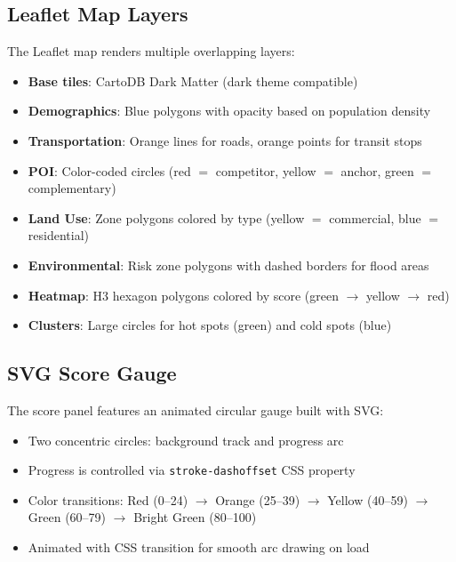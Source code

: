 \documentclass[12pt, a4paper]{article}
\begin{document}
\subsection{Leaflet Map Layers}

The Leaflet map renders multiple overlapping layers:

\begin{itemize}[leftmargin=2em]
    \item \textbf{Base tiles}: CartoDB Dark Matter (dark theme compatible)
    \item \textbf{Demographics}: Blue polygons with opacity based on population density
    \item \textbf{Transportation}: Orange lines for roads, orange points for transit stops
    \item \textbf{POI}: Color-coded circles (red $=$ competitor, yellow $=$ anchor, green $=$ complementary)
    \item \textbf{Land Use}: Zone polygons colored by type (yellow $=$ commercial, blue $=$ residential)
    \item \textbf{Environmental}: Risk zone polygons with dashed borders for flood areas
    \item \textbf{Heatmap}: H3 hexagon polygons colored by score (green $\to$ yellow $\to$ red)
    \item \textbf{Clusters}: Large circles for hot spots (green) and cold spots (blue)
\end{itemize}

\subsection{SVG Score Gauge}

The score panel features an animated circular gauge built with SVG:

\begin{itemize}[leftmargin=2em]
    \item Two concentric circles: background track and progress arc
    \item Progress is controlled via \texttt{stroke-dashoffset} CSS property
    \item Color transitions: \textcolor{rose}{Red (0--24)} $\to$ \textcolor{amber}{Orange (25--39)}
          $\to$ \textcolor{amber}{Yellow (40--59)} $\to$ \textcolor{emerald}{Green (60--79)}
          $\to$ \textcolor{emerald}{Bright Green (80--100)}
    \item Animated with CSS transition for smooth arc drawing on load
\end{itemize}
\end{document}
